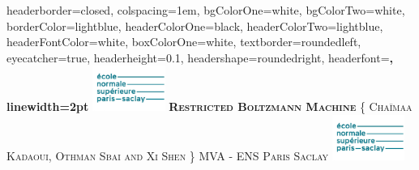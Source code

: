\documentclass[landscape,a1paper,fontscale=0.5]{baposter} %
\begin{document}
\begin{poster}
{
headerborder=closed, %
colspacing=1em, %
bgColorOne=white, %
bgColorTwo=white, %
borderColor=lightblue, %
headerColorOne=black, %
headerColorTwo=lightblue, %
headerFontColor=white, %
boxColorOne=white, %
textborder=roundedleft, %
eyecatcher=true, %
headerheight=0.1\textheight, %
headershape=roundedright, %
headerfont=\Large\bf\textsc, %
linewidth=2pt %
}
%
{\includegraphics[height=4em]{logo.png}} %
{\bf\textsc{Restricted Boltzmann Machine}\vspace{0.5em}} %
{\textsc{\{ Chaïmaa Kadaoui, Othman Sbai and Xi Shen \} \hspace{12pt} MVA - ENS Paris Saclay}} %
{\includegraphics[height=4em]{logo.png}} %



\end{poster}
\end{document}
